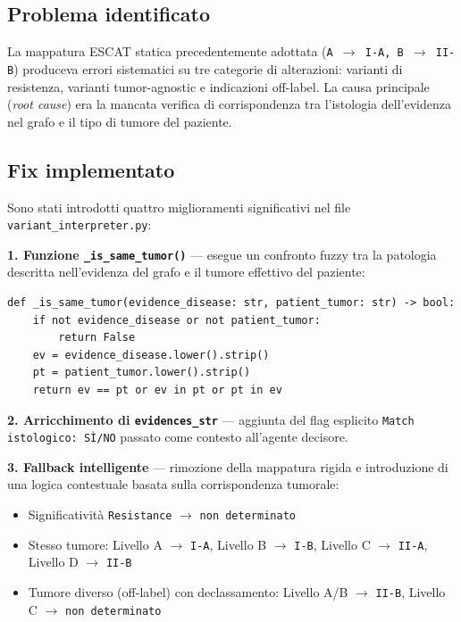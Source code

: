 \documentclass[12pt, a4paper]{article}
\begin{document}
\subsection{Problema identificato}
La mappatura ESCAT statica precedentemente adottata (\texttt{A $\rightarrow$ I-A, B $\rightarrow$ II-B}) produceva errori sistematici su tre categorie di alterazioni: varianti di resistenza, varianti tumor-agnostic e indicazioni off-label. La causa principale (\textit{root cause}) era la mancata verifica di corrispondenza tra l'istologia dell'evidenza nel grafo e il tipo di tumore del paziente.

\subsection{Fix implementato}
Sono stati introdotti quattro miglioramenti significativi nel file \texttt{variant\_interpreter.py}:

\textbf{1. Funzione \texttt{\_is\_same\_tumor()}} --- esegue un confronto fuzzy tra la patologia descritta nell'evidenza del grafo e il tumore effettivo del paziente:
\begin{tcolorbox}[colback=lightgray, colframe=primaryblue, title=Verifica corrispondenza istologica, boxrule=1pt, arc=4pt]
\begin{verbatim}
def _is_same_tumor(evidence_disease: str, patient_tumor: str) -> bool:
    if not evidence_disease or not patient_tumor:
        return False
    ev = evidence_disease.lower().strip()
    pt = patient_tumor.lower().strip()
    return ev == pt or ev in pt or pt in ev
\end{verbatim}
\end{tcolorbox}

\textbf{2. Arricchimento di \texttt{evidences\_str}} --- aggiunta del flag esplicito \texttt{Match istologico: SÌ/NO} passato come contesto all'agente decisore.

\textbf{3. Fallback intelligente} --- rimozione della mappatura rigida e introduzione di una logica contestuale basata sulla corrispondenza tumorale:
\begin{itemize}[leftmargin=1.5em, itemsep=2pt]
  \item Significatività \texttt{Resistance} $\rightarrow$ \texttt{non determinato}
  \item Stesso tumore: Livello A $\rightarrow$ \texttt{I-A}, Livello B $\rightarrow$ \texttt{I-B}, Livello C $\rightarrow$ \texttt{II-A}, Livello D $\rightarrow$ \texttt{II-B}
  \item Tumore diverso (off-label) con declassamento: Livello A/B $\rightarrow$ \texttt{II-B}, Livello C $\rightarrow$ \texttt{non determinato}
\end{itemize}
\end{document}
